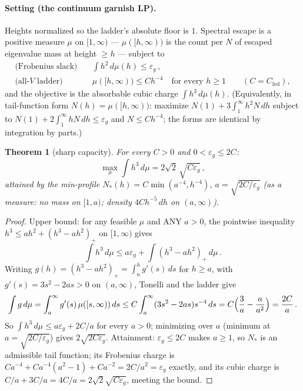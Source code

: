 \documentclass[11pt]{article}
\theoremstyle{plain}
\newtheorem{theorem}{Theorem}[section]
\theoremstyle{definition}
\theoremstyle{remark}
\newcommand{\Cled}{C_{\mathrm{led}}}
\begin{document}
\paragraph{Setting (the continuum garnish LP).}
Heights normalized so the ladder's absolute floor is $1$. Spectral escape is a
positive measure $\mu$ on $[1, \infty)$ --- $\mu([h, \infty))$ is the count per
$N$ of escaped eigenvalue mass at height $\ge h$ --- subject to
\begin{align*}
  \text{(Frobenius slack)} \quad & \int h^2\, d\mu(h) \le \varepsilon_g \,,\\
  \text{(all-$V$ ladder)} \quad & \mu([h, \infty)) \le C h^{-4}
    \quad \text{for every } h \ge 1 \qquad (C = \Cled),
\end{align*}
and the objective is the absorbable cubic charge $\int h^3\, d\mu(h)$.
(Equivalently, in tail-function form $N(h) = \mu([h, \infty))$: maximize
$N(1) + 3\int_1^\infty h^2 N\, dh$ subject to
$N(1) + 2\int_1^\infty h N\, dh \le \varepsilon_g$ and $N \le C h^{-4}$; the
forms are identical by integration by parts.)

\begin{theorem}[sharp capacity]
\label{thm:capacity}
For every $C > 0$ and $0 < \varepsilon_g \le 2C$:
\[
  \max_\mu \int h^3\, d\mu = 2\sqrt{2}\,\sqrt{C \varepsilon_g}\,,
\]
attained by the min-profile $N_*(h) = C\min(a^{-4}, h^{-4})$,
$a = \sqrt{2C/\varepsilon_g}$ (as a measure: no mass on $[1, a)$; density
$4 C h^{-5}\, dh$ on $(a, \infty)$).
\end{theorem}

\begin{proof}
Upper bound: for any feasible $\mu$ and ANY $a > 0$, the pointwise inequality
$h^3 \le a h^2 + (h^3 - a h^2)_+$ on $[1, \infty)$ gives
\[
  \int h^3\, d\mu \le a \varepsilon_g + \int (h^3 - a h^2)_+\, d\mu \,.
\]
Writing $g(h) = (h^3 - a h^2)_+ = \int_a^h g'(s)\, ds$ for $h \ge a$, with
$g'(s) = 3 s^2 - 2 a s > 0$ on $(a, \infty)$, Tonelli and the ladder give
\[
  \int g\, d\mu = \int_a^\infty g'(s)\, \mu([s, \infty))\, ds
  \le C \int_a^\infty (3 s^2 - 2 a s) s^{-4}\, ds
  = C\Bigl( \frac{3}{a} - \frac{a}{a^2} \Bigr)
  = \frac{2C}{a} \,.
\]
So $\int h^3\, d\mu \le a \varepsilon_g + 2C/a$ for every $a > 0$; minimizing
over $a$ (minimum at $a = \sqrt{2C/\varepsilon_g}$) gives
$2\sqrt{2 C \varepsilon_g}$. Attainment: $\varepsilon_g \le 2C$ makes
$a \ge 1$, so $N_*$ is an admissible tail function; its Frobenius charge is
$C a^{-4} + C a^{-4}(a^2 - 1) + C a^{-2} = 2C/a^2 = \varepsilon_g$ exactly, and
its cubic charge is $C/a + 3C/a = 4C/a = 2\sqrt{2}\sqrt{C \varepsilon_g}$,
meeting the bound.
\end{proof}
\end{document}
